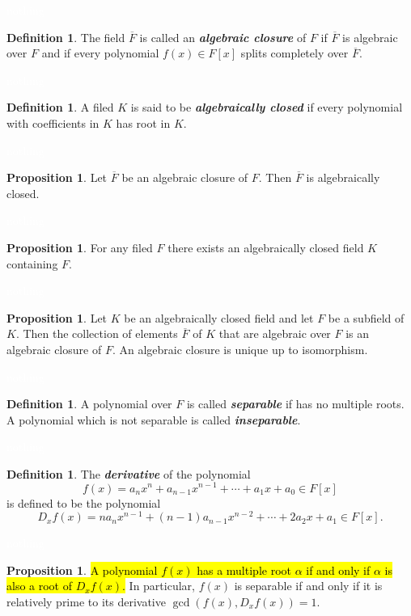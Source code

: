\documentclass{article}
\theoremstyle{definition}
\newtheorem{prop}[thm]{Proposition}
\newtheorem{defn}[thm]{Definition}
\newcommand{\nl}{\textcolor{white}{nothing}}
\newcommand{\ol}{\overline}
\newcommand{\al}{\alpha}
\begin{document}
\nl

\begin{defn}
The field $\ol F$ is called an \textit{\textbf{algebraic closure}} of $F$ if $\ol F$ is algebraic over $F$ and if every polynomial $f(x)\in F[x]$ splits completely over $\ol F$.
\end{defn}

\nl

\begin{defn}
A filed $K$ is said to be \textit{\textbf{algebraically closed}} if every polynomial with coefficients in $K$ has root in $K$.
\end{defn}

\nl

\begin{prop}
Let $\ol F$ be an algebraic closure of $F$. Then $\ol F$ is algebraically closed.
\end{prop}

\nl

\begin{prop}
For any filed $F$ there exists an algebraically closed field $K$ containing $F$.
\end{prop}

\nl

\begin{prop}
Let $K$ be an algebraically closed field and let $F$ be a subfield of $K$. Then the collection of elements $\ol F$ of $K$ that are algebraic over $F$ is an algebraic closure of $F$. An algebraic closure is unique up to isomorphism.
\end{prop}

\nl

\begin{defn}
A polynomial over $F$ is called \textit{\textbf{separable}} if has no multiple roots. A polynomial which is not separable is called \textit{\textbf{inseparable}}.
\end{defn}

\nl

\begin{defn}
The \textit{\textbf{derivative}} of the polynomial
\[f(x) = a_nx^n + a_{n - 1}x^{n - 1} + \cdots + a_1x + a_0\in F[x]\]
is defined to be the polynomial
\[D_xf(x) = na_n x^{n - 1} + (n - 1)a_{n - 1}x^{n - 2} + \cdots + 2a_2x + a_1 \in F[x].\]
\end{defn}

\nl

\begin{prop}
\hl{A polynomial $f(x)$ has a multiple root $\al$ if and only if $\al$ is also a root of $D_xf(x)$.} In particular, $f(x)$ is separable if and only if it is relatively prime to its derivative $\gcd(f(x), D_xf(x)) = 1$.
\end{prop}
\end{document}
